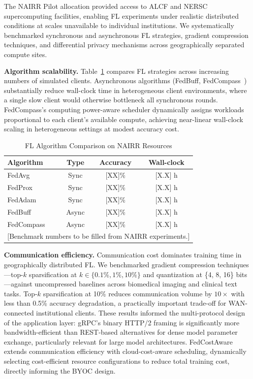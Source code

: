 \documentclass[conference]{IEEEtran}
\begin{document}
The NAIRR Pilot allocation provided access to ALCF and NERSC
supercomputing facilities, enabling FL experiments under realistic
distributed conditions at scales unavailable to individual institutions.
We systematically benchmarked synchronous and asynchronous FL
strategies, gradient compression techniques, and differential privacy
mechanisms across geographically separated compute sites.

\textbf{Algorithm scalability.}
Table~\ref{tab:algorithms} compares FL strategies across increasing
numbers of simulated clients. Asynchronous algorithms (FedBuff,
FedCompass~\cite{li2024fedcompass}) substantially reduce wall-clock
time in heterogeneous client environments, where a single slow client
would otherwise bottleneck all synchronous rounds. FedCompass's
computing power-aware scheduler dynamically assigns workloads
proportional to each client's available compute, achieving near-linear
wall-clock scaling in heterogeneous settings at modest accuracy cost.

\begin{table}[t]
\caption{FL Algorithm Comparison on NAIRR Resources}
\label{tab:algorithms}
\begin{center}
\begin{tabular}{l c c c}
\toprule
\textbf{Algorithm} & \textbf{Type} & \textbf{Accuracy} & \textbf{Wall-clock} \\
\midrule
FedAvg      & Sync  & [XX]\% & [X.X] h \\
FedProx     & Sync  & [XX]\% & [X.X] h \\
FedAdam     & Sync  & [XX]\% & [X.X] h \\
FedBuff     & Async & [XX]\% & [X.X] h \\
FedCompass  & Async & [XX]\% & [X.X] h \\
\bottomrule
\multicolumn{4}{l}{\small [Benchmark numbers to be filled from NAIRR experiments.]}
\end{tabular}
\end{center}
\end{table}

\textbf{Communication efficiency.}
Communication cost dominates training time in geographically
distributed FL. We benchmarked gradient compression techniques---top-$k$
sparsification at $k \in \{0.1\%, 1\%, 10\%\}$ and quantization at
\{4, 8, 16\} bits---against uncompressed baselines across biomedical
imaging and clinical text tasks. Top-$k$ sparsification at 10\%
reduces communication volume by $10\times$ with less than 0.5\%
accuracy degradation, a practically important trade-off for
WAN-connected institutional clients. These results informed the
multi-protocol design of the application layer: gRPC's binary HTTP/2
framing is significantly more bandwidth-efficient than REST-based
alternatives for dense model parameter exchange, particularly relevant
for large model architectures. FedCostAware~\cite{sinha2025fedcostaware}
extends communication efficiency with cloud-cost-aware scheduling,
dynamically selecting cost-efficient resource configurations to reduce
total training cost, directly informing the BYOC design.
\end{document}
